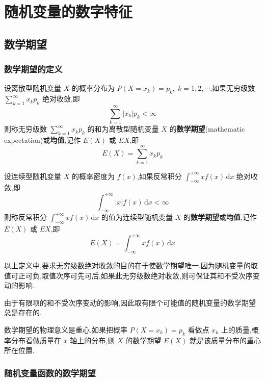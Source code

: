 
\chapter{随机变量的数字特征}
\thispagestyle{plain}

\section{数学期望}

\subsection{数学期望的定义}

\begin{definition}
    \indent 设离散型随机变量 $X$ 的概率分布为 $P(X=x_k) = p_k, \; k=1,2,\cdots$,如果无穷级数 $\displaystyle\sum_{k=1}^{\infty} x_k p_k$ 绝对收敛,即
    $$
    \sum_{k=1}^{\infty} |x_k| p_k < \infty
    $$
    则称无穷级数 $\displaystyle\sum_{k=1}^{\infty} x_k p_k$ 的和为离散型随机变量 $X$ 的\textbf{数学期望}(mathematic expectation)或\textbf{均值},记作 $E(X)$ 或 $EX$,即
    $$
    E(X) = \sum_{k=1}^{\infty} x_k p_k
    $$

    设连续型随机变量 $X$ 的概率密度为 $f(x)$,如果反常积分 $\displaystyle\int_{-\infty}^{+\infty} x f(x) \, \text{d}x$ 绝对收敛,即
    $$
    \int_{-\infty}^{+\infty} |x| f(x) \, \text{d}x < \infty
    $$
    则称反常积分 $\displaystyle\int_{-\infty}^{+\infty} x f(x) \, \text{d}x$ 的值为连续型随机变量 $X$ 的\textbf{数学期望}或\textbf{均值},记作 $E(X)$ 或 $EX$,即
    $$
    E(X) = \int_{-\infty}^{+\infty} x f(x) \, \text{d}x
    $$
\end{definition}

\begin{note}
    \indent 以上定义中,要求无穷级数绝对收敛的目的在于使数学期望唯一.因为随机变量的取值可正可负,取值次序可先可后,如果此无穷级数绝对收敛,则可保证其和不受次序变动的影响.

    由于有限项的和不受次序变动的影响,因此取有限个可能值的随机变量的数学期望总是存在的.
\end{note}

数学期望的物理意义是重心.如果把概率 $P(X=x_k) = p_k$ 看做点 $x_k$ 上的质量,概率分布看做质量在 $x$ 轴上的分布,则 $X$ 的数学期望 $E(X)$ 就是该质量分布的重心所在位置.

\subsection{随机变量函数的数学期望}


